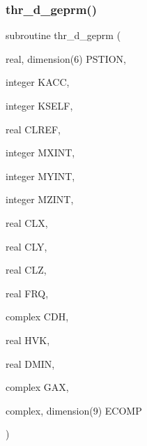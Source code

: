 \subsubsection{\texorpdfstring{thr\+\_\+d\+\_\+geprm()}{thr\_d\_geprm()}}
{\footnotesize\ttfamily subroutine thr\+\_\+d\+\_\+geprm (\begin{DoxyParamCaption}\item[{real, dimension(6)}]{P\+S\+T\+I\+ON,  }\item[{integer}]{K\+A\+CC,  }\item[{integer}]{K\+S\+E\+LF,  }\item[{real}]{C\+L\+R\+EF,  }\item[{integer}]{M\+X\+I\+NT,  }\item[{integer}]{M\+Y\+I\+NT,  }\item[{integer}]{M\+Z\+I\+NT,  }\item[{real}]{C\+LX,  }\item[{real}]{C\+LY,  }\item[{real}]{C\+LZ,  }\item[{real}]{F\+RQ,  }\item[{complex}]{C\+DH,  }\item[{real}]{H\+VK,  }\item[{real}]{D\+M\+IN,  }\item[{complex}]{G\+AX,  }\item[{complex, dimension(9)}]{E\+C\+O\+MP }\end{DoxyParamCaption})}

